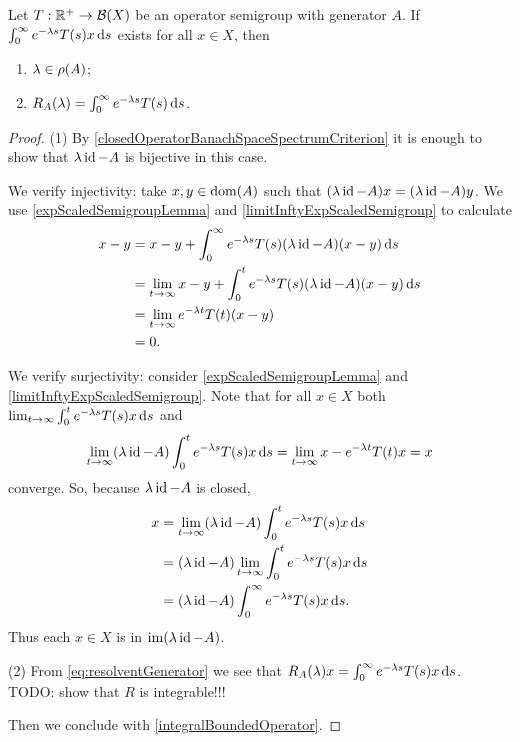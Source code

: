 \begin{proposition} \label{integralRepresentationOfResolvent}
Let $T: \mathbb{R}^+\to \operatorname{\mathcal{B}}(X)$ be an operator semigroup with generator $A$. If $\int_0^\infty e^{-\lambda s}T(s)x\operatorname{d \!}{s}$ exists for all $x\in X$, then
\begin{enumerate}
\item $\lambda\in\rho(A)$;
\item $R_A(\lambda) = \int_0^\infty e^{-\lambda s}T(s)\operatorname{d \!}{s}$.
\end{enumerate}
\end{proposition}
\begin{proof}
(1) By \ref{closedOperatorBanachSpaceSpectrumCriterion} it is enough to show that $\lambda\operatorname{id} - A$ is bijective in this case. 

We verify injectivity: take $x,y\in \operatorname{dom}(A)$ such that $(\lambda\operatorname{id} - A)x = (\lambda\operatorname{id} - A)y$. We use \ref{expScaledSemigroupLemma} and \ref{limitInftyExpScaledSemigroup} to calculate
\begin{align*}
x-y &= x-y + \int_0^\infty e^{-\lambda s}T(s)(\lambda\operatorname{id} - A)(x-y)\operatorname{d \!}{s} \\
&= \lim_{t\to \infty}x-y + \int_0^t e^{-\lambda s}T(s)(\lambda\operatorname{id} - A)(x-y)\operatorname{d \!}{s} \\
&= \lim_{t\to \infty}e^{-\lambda t}T(t)(x-y) \\
&= 0.
\end{align*}

We verify surjectivity: consider \ref{expScaledSemigroupLemma} and \ref{limitInftyExpScaledSemigroup}. Note that for all $x\in X$ both $\lim_{t\to \infty}\int_0^t e^{-\lambda s}T(s)x\operatorname{d \!}{s}$ and
\[ \lim_{t\to \infty}(\lambda\operatorname{id}-A)\int_0^t e^{-\lambda s}T(s)x\operatorname{d \!}{s} = \lim_{t\to \infty}x - e^{-\lambda t}T(t)x = x \]
converge. So, because $\lambda \operatorname{id} - A$ is closed,
\begin{align}
    x &= \lim_{t\to \infty}(\lambda\operatorname{id}-A)\int_0^t e^{-\lambda s}T(s)x\operatorname{d \!}{s} \nonumber \\
    &= (\lambda\operatorname{id}-A)\lim_{t\to \infty}\int_0^t e^{-\lambda s}T(s)x\operatorname{d \!}{s} \nonumber \\
    &= (\lambda\operatorname{id}-A)\int_0^\infty e^{-\lambda s}T(s)x\operatorname{d \!}{s}. \label{eq:resolventGenerator}
\end{align}
Thus each $x\in X$ is in $\operatorname{im}(\lambda\operatorname{id}-A)$.

(2) From \eqref{eq:resolventGenerator} we see that $R_A(\lambda)x = \int_0^\infty e^{-\lambda s}T(s)x\operatorname{d \!}{s}$. TODO: show that $R$ is integrable!!!

Then we conclude with \ref{integralBoundedOperator}.
\end{proof}
